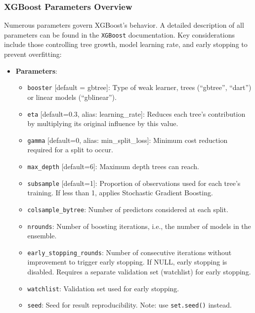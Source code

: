 \documentclass[
  letterpaper,
  DIV=11,
  numbers=noendperiod,
  oneside]{scrartcl}
\providecommand{\tightlist}{%
  \setlength{\itemsep}{0pt}\setlength{\parskip}{0pt}}\usepackage{longtable,booktabs,array}
\begin{document}
\subsubsection{XGBoost Parameters
Overview}\label{xgboost-parameters-overview-1}

Numerous parameters govern XGBoost's behavior. A detailed description of
all parameters can be found in the \texttt{XGBoost} documentation. Key
considerations include those controlling tree growth, model learning
rate, and early stopping to prevent overfitting:

\begin{itemize}
\tightlist
\item
  \textbf{Parameters}:

  \begin{itemize}
  \tightlist
  \item
    \texttt{booster} {[}default = gbtree{]}: Type of weak learner, trees
    (``gbtree'', ``dart'') or linear models (``gblinear'').
  \item
    \texttt{eta} {[}default=0.3, alias: learning\_rate{]}: Reduces each
    tree's contribution by multiplying its original influence by this
    value.
  \item
    \texttt{gamma} {[}default=0, alias: min\_split\_loss{]}: Minimum
    cost reduction required for a split to occur.
  \item
    \texttt{max\_depth} {[}default=6{]}: Maximum depth trees can reach.
  \item
    \texttt{subsample} {[}default=1{]}: Proportion of observations used
    for each tree's training. If less than 1, applies Stochastic
    Gradient Boosting.
  \item
    \texttt{colsample\_bytree}: Number of predictors considered at each
    split.
  \item
    \texttt{nrounds}: Number of boosting iterations, i.e., the number of
    models in the ensemble.
  \item
    \texttt{early\_stopping\_rounds}: Number of consecutive iterations
    without improvement to trigger early stopping. If NULL, early
    stopping is disabled. Requires a separate validation set (watchlist)
    for early stopping.
  \item
    \texttt{watchlist}: Validation set used for early stopping.
  \item
    \texttt{seed}: Seed for result reproducibility. Note: use
    \texttt{set.seed()} instead.
  \end{itemize}
\end{itemize}
\end{document}
